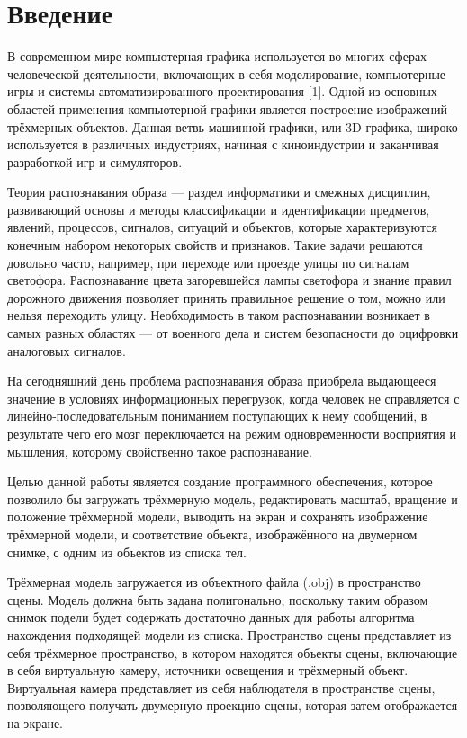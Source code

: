 \chapter*{Введение}
В современном мире компьютерная графика используется во многих сферах человеческой деятельности, включающих в себя моделирование, компьютерные игры и системы автоматизированного проектирования [1]. Одной из основных областей применения компьютерной графики является построение изображений трёхмерных объектов. Данная ветвь машинной графики, или 3D-графика, широко используется в различных индустриях, начиная с киноиндустрии и заканчивая разработкой игр и симуляторов.

Теория распознавания образа — раздел информатики и смежных дисциплин, развивающий основы и методы классификации и идентификации предметов, явлений, процессов, сигналов, ситуаций и объектов, которые характеризуются конечным набором некоторых свойств и признаков. Такие задачи решаются довольно часто, например, при переходе или проезде улицы по сигналам светофора. Распознавание цвета загоревшейся лампы светофора и знание правил дорожного движения позволяет принять правильное решение о том, можно или нельзя переходить улицу. Необходимость в таком распознавании возникает в самых разных областях — от военного дела и систем безопасности до оцифровки аналоговых сигналов.

На сегодняшний день проблема распознавания образа приобрела выдающееся значение в условиях информационных перегрузок, когда человек не справляется с линейно-последовательным пониманием поступающих к нему сообщений, в результате чего его мозг переключается на режим одновременности восприятия и мышления, которому свойственно такое распознавание.

Целью данной работы является создание программного обеспечения, которое позволило бы загружать трёхмерную модель, редактировать масштаб, вращение и положение трёхмерной модели, выводить на экран и сохранять изображение трёхмерной модели, и  соответствие объекта, изображённого на двумерном снимке, с одним из объектов из списка тел. 

Трёхмерная модель загружается из объектного файла (.obj) в пространство сцены. Модель должна быть задана полигонально, поскольку таким образом снимок подели будет содержать достаточно данных для работы алгоритма нахождения подходящей модели из списка. Пространство сцены представляет из себя трёхмерное пространство, в котором находятся объекты сцены, включающие в себя виртуальную камеру, источники освещения и трёхмерный объект. Виртуальная камера представляет из себя наблюдателя в пространстве сцены, позволяющего получать двумерную проекцию сцены, которая затем отображается на экране.

